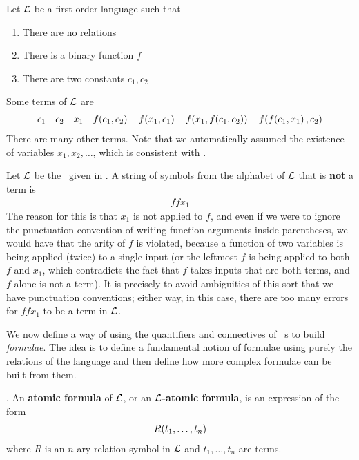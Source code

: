 \begin{boxexample}\label{Ch2:Eg:Terms_FO_Logic}
    Let $\mathcal{L}$ be a first-order language such that
    \begin{enumerate}
        \item There are no relations
        \item There is a binary function $f$
        \item There are two constants $c_1, c_2$
    \end{enumerate}
    Some terms of $\mathcal{L}$ are
    \begin{align*}
        c_1 \quad c_2 \quad x_1 \quad f\!\left( c_1, c_2 \right) \quad f\!\left( x_1, c_1 \right) \quad f\!\left( x_1, f\!\left( c_1, c_2 \right) \right) \quad f\!\left( f\!\left( c_1, x_1 \right), c_2 \right)
    \end{align*}
    There are many other terms. Note that we automatically assumed the existence of variables $x_1, x_2, \ldots$, which is consistent with . 
\end{boxexample}
\begin{boxnexample}
    Let $\mathcal{L}$ be the \fola\ given in . A string of symbols from the alphabet of $\mathcal{L}$ that is \textbf{not} a term is
    \begin{align*}
        f f x_1
    \end{align*}
    The reason for this is that $x_1$ is not applied to $f$, and even if we were to ignore the punctuation convention of writing function arguments inside parentheses, we would have that the arity of $f$ is violated, because a function of two variables is being applied (twice) to a single input (or the leftmost $f$ is being applied to both $f$ and $x_1$, which contradicts the fact that $f$ takes inputs that are both terms, and $f$ alone is not a term). It is precisely to avoid ambiguities of this sort that we have punctuation conventions; either way, in this case, there are too many errors for $f f x_1$ to be a term in $\mathcal{L}$.
\end{boxnexample}

We now define a way of using the quantifiers and connectives of \fola~s to build \textit{formulae}. The idea is to define a fundamental notion of formulae using purely the relations of the language and then define how more complex formulae can be built from them.

\begin{boxdefinition}
    . An \textbf{atomic formula} of $\mathcal{L}$, or an \textbf{$\mathcal{L}$-atomic formula}, is an expression of the form
    \begin{align*}
        R\!\left( t_1, \ldots, t_n \right)
    \end{align*}
    where $R$ is an $n$-ary relation symbol in $\mathcal{L}$ and $t_1, \ldots, t_n$ are terms.
\end{boxdefinition}


